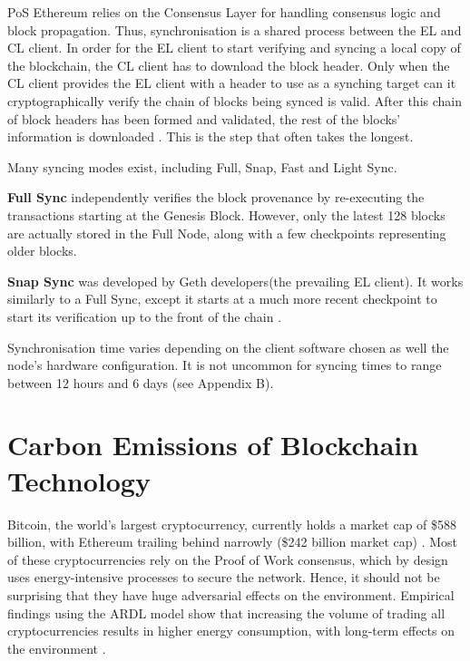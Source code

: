PoS Ethereum relies on the Consensus Layer for handling consensus logic and block propagation. Thus, synchronisation is a shared process between the EL and CL client. In order for the EL client to start verifying and syncing a local copy of the blockchain, the CL client has to download the block header. Only when the CL client provides the EL client with a header to use as a synching target can it cryptographically verify the chain of blocks being synced is valid. After this chain of block headers has been formed and validated, the rest of the blocks' information is downloaded \cite{2022DeveloperGo-ethereum}. This is the step that often takes the longest.

Many syncing modes exist, including Full, Snap, Fast and Light Sync.

\textbf{Full Sync }independently verifies the block provenance by re-executing the transactions starting at the Genesis Block. However, only the latest 128 blocks are actually stored in the Full Node, along with a few checkpoints representing older blocks. 

\textbf{Snap Sync }was developed by Geth developers(the prevailing EL client). It works similarly to a Full Sync, except it starts at a much more recent checkpoint to start its verification up to the front of the chain \cite{2022DeveloperGo-ethereum}.

Synchronisation time varies depending on the client software chosen as well the node's hardware configuration. It is not uncommon for syncing times to range between 12 hours and 6 days (see Appendix B).



\section{Carbon Emissions of Blockchain Technology }

Bitcoin, the world's largest cryptocurrency, currently holds a market cap of \$588 billion, with Ethereum trailing behind narrowly (\$242 billion market cap) \cite{BitcoinCoinMarketCap}. Most of these cryptocurrencies rely on the Proof of Work consensus, which by design uses energy-intensive processes to secure the network. Hence, it should not be surprising that they have huge adversarial effects on the environment. Empirical findings using the ARDL model show that increasing the volume of trading all cryptocurrencies results in higher energy consumption, with long-term effects on the environment \cite{Schinckus2020Crypto-currenciesConsumption}. \newline 


